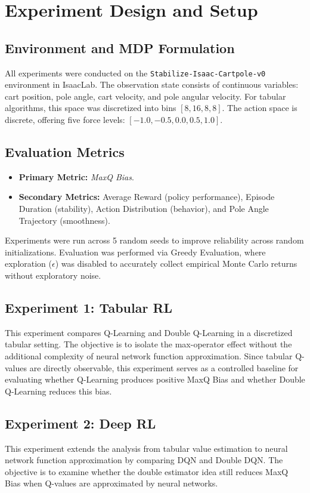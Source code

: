 \documentclass[11pt,a4paper]{article}
\begin{document}
\section{Experiment Design and Setup}

\subsection{Environment and MDP Formulation}
All experiments were conducted on the \texttt{Stabilize-Isaac-Cartpole-v0} environment in IsaacLab. The observation state consists of continuous variables: cart position, pole angle, cart velocity, and pole angular velocity. For tabular algorithms, this space was discretized into bins $[8, 16, 8, 8]$. The action space is discrete, offering five force levels: $[-1.0, -0.5, 0.0, 0.5, 1.0]$. 

\subsection{Evaluation Metrics}
\begin{itemize}
    \item \textbf{Primary Metric:} \textit{MaxQ Bias}.
    \item \textbf{Secondary Metrics:} Average Reward (policy performance), Episode Duration (stability), Action Distribution (behavior), and Pole Angle Trajectory (smoothness).
\end{itemize}

Experiments were run across 5 random seeds to improve reliability across random initializations. Evaluation was performed via Greedy Evaluation, where exploration ($\epsilon$) was disabled to accurately collect empirical Monte Carlo returns without exploratory noise.

\subsection{Experiment 1: Tabular RL}
This experiment compares Q-Learning and Double Q-Learning in a discretized tabular setting. The objective is to isolate the max-operator effect without the additional complexity of neural network function approximation. Since tabular Q-values are directly observable, this experiment serves as a controlled baseline for evaluating whether Q-Learning produces positive MaxQ Bias and whether Double Q-Learning reduces this bias.

\subsection{Experiment 2: Deep RL}
This experiment extends the analysis from tabular value estimation to neural network function approximation by comparing DQN and Double DQN. The objective is to examine whether the double estimator idea still reduces MaxQ Bias when Q-values are approximated by neural networks. 
\end{document}
